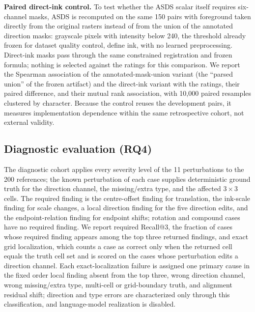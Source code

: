 \medskip
\noindent\textbf{Paired direct-ink control.}
To test whether the ASDS scalar itself requires six-channel masks, ASDS is
recomputed on the same 150 pairs with foreground taken directly from the
original rasters instead of from the union of the annotated direction
masks: grayscale pixels with intensity below 240, the threshold
already frozen for dataset quality control, define ink, with no learned
preprocessing. Direct-ink masks pass through the same constrained
registration and frozen formula; nothing is selected against the ratings for
this comparison. We report the Spearman association of the annotated-mask-union variant
(the ``parsed union'' of the frozen artifact) and the direct-ink variant with the
ratings, their
paired difference, and their mutual rank association, with 10,000 paired
resamples clustered by character. Because the control reuses the development
pairs, it measures implementation dependence within the same retrospective
cohort, not external validity.

\subsection{Diagnostic evaluation (RQ4)}
\label{sec:setup-diagnostic}

The diagnostic cohort applies every severity level of the 11 perturbations
to the 200 references; the known perturbation of each case supplies
deterministic ground truth for the direction channel, the missing/extra
type, and the affected \(3\times3\) cells. The required finding is the centre-offset
finding for translation, the ink-scale finding for scale changes, a local
direction finding for the five direction edits, and the endpoint-relation
finding for endpoint shifts; rotation and compound cases have no required
finding. We report required Recall@3, the fraction of cases whose required
finding appears among the top three returned findings, and exact grid
localization, which counts a case as
correct only when the returned cell equals the truth cell set and is scored
on the cases whose perturbation edits a direction channel. Each exact-localization failure is assigned one primary cause in the fixed
order local finding absent from the top three, wrong direction channel,
wrong missing/extra type, multi-cell or grid-boundary truth, and alignment
residual shift; direction and type errors are characterized only through
this classification, and language-model realization is disabled.
